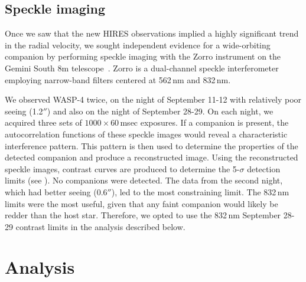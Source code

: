 \documentclass[12pt,twocolumn,tighten,trackchanges]{aastex62}
\begin{document}
\subsection{Speckle imaging}

Once we saw that the new HIRES observations implied a highly
significant trend in the radial velocity, we sought independent
evidence for a wide-orbiting companion by performing speckle imaging
with the Zorro instrument on the Gemini South 8m
telescope~\citep[see][and the instrument
web-pages\footnote{\url{www.gemini.edu/sciops/instruments/alopeke-zorro/}}]{scott_nessi_2018}.
Zorro is a dual-channel speckle interferometer employing narrow-band
filters centered at 562$\,$nm and 832$\,$nm.  

We observed WASP-4 twice, on the night of September 11-12 with
relatively poor seeing (1.2$''$) and also on the night of September
28-29.  On each night, we acquired three sets of $1000\times
60$$\,$msec exposures.  If a companion is present, the autocorrelation
functions of these speckle images would reveal a characteristic
interference pattern. This pattern is then used to determine the
properties of the detected companion and produce a reconstructed
image.  Using the reconstructed speckle images, contrast curves are
produced to determine the 5-$\sigma$ detection limits (see
\citealt{howell_speckle_2011}).  No companions were detected. The data
from the second night, which had better seeing (0.6$''$), led to the
most constraining limit.  The 832$\,$nm limits were the most useful,
given that any faint companion would likely be redder than the host
star.  Therefore, we opted to use the 832$\,$nm September 28-29
contrast limits in the analysis described below.


\section{Analysis}
\label{sec:analysis}
\end{document}
